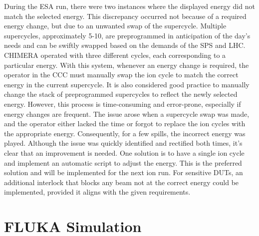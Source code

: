 \documentclass{cernatsnote}
\begin{document}
During the ESA run, there were two instances where the displayed energy did not match the selected energy. This discrepancy occurred not because of a required energy change, but due to an unwanted swap of the supercycle. Multiple supercycles, approximately 5-10, are preprogrammed in anticipation of the day's needs and can be swiftly swapped based on the demands of the SPS and LHC. CHIMERA operated with three different cycles, each corresponding to a particular energy. With this system, whenever an energy change is required, the operator in the CCC must manually swap the ion cycle to match the correct energy in the current supercycle. It is also considered good practice to manually change the stack of preprogrammed supercycles to reflect the newly selected energy. However, this process is time-consuming and error-prone, especially if energy changes are frequent. The issue arose when a supercycle swap was made, and the operator either lacked the time or forgot to replace the ion cycles with the appropriate energy. Consequently, for a few spills, the incorrect energy was played. Although the issue was quickly identified and rectified both times, it's clear that an improvement is needed. One solution is to have a single ion cycle and implement an automatic script to adjust the energy. This is the preferred solution and will be implemented for the next ion run. For sensitive DUTs, an additional interlock that blocks any beam not at the correct energy could be implemented, provided it aligns with the given requirements.

\section{FLUKA Simulation}


\clearpage
\clearpage
\end{document}
